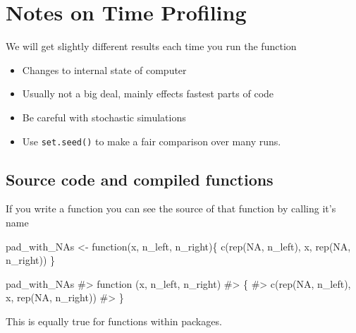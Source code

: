 \documentclass[
  letterpaper,
  DIV=11,
  numbers=noendperiod]{scrreprt}
\newenvironment{Shaded}{\begin{snugshade}}{\end{snugshade}}
\newcommand{\CommentTok}[1]{\textcolor[rgb]{0.37,0.37,0.37}{#1}}
\newcommand{\ConstantTok}[1]{\textcolor[rgb]{0.56,0.35,0.01}{#1}}
\newcommand{\ControlFlowTok}[1]{\textcolor[rgb]{0.00,0.23,0.31}{#1}}
\newcommand{\FunctionTok}[1]{\textcolor[rgb]{0.28,0.35,0.67}{#1}}
\newcommand{\NormalTok}[1]{\textcolor[rgb]{0.00,0.23,0.31}{#1}}
\newcommand{\OtherTok}[1]{\textcolor[rgb]{0.00,0.23,0.31}{#1}}
\providecommand{\tightlist}{%
  \setlength{\itemsep}{0pt}\setlength{\parskip}{0pt}}\usepackage{longtable,booktabs,array}
\begin{document}
\section{Notes on Time Profiling}\label{notes-on-time-profiling}

We will get slightly different results each time you run the function

\begin{itemize}
\tightlist
\item
  Changes to internal state of computer
\item
  Usually not a big deal, mainly effects fastest parts of code
\item
  Be careful with stochastic simulations
\item
  Use \texttt{set.seed()} to make a fair comparison over many runs.
\end{itemize}

\subsection{Source code and compiled
functions}\label{source-code-and-compiled-functions}

If you write a function you can see the source of that function by
calling it's name

\begin{Shaded}
\begin{Highlighting}[]
\NormalTok{pad\_with\_NAs }\OtherTok{\textless{}{-}} \ControlFlowTok{function}\NormalTok{(x, n\_left, n\_right)\{}
  \FunctionTok{c}\NormalTok{(}\FunctionTok{rep}\NormalTok{(}\ConstantTok{NA}\NormalTok{, n\_left), x, }\FunctionTok{rep}\NormalTok{(}\ConstantTok{NA}\NormalTok{, n\_right))}
\NormalTok{\}}
\end{Highlighting}
\end{Shaded}

\begin{Shaded}
\begin{Highlighting}[]
\NormalTok{pad\_with\_NAs}
\CommentTok{\#\textgreater{} function (x, n\_left, n\_right) }
\CommentTok{\#\textgreater{} \{}
\CommentTok{\#\textgreater{}     c(rep(NA, n\_left), x, rep(NA, n\_right))}
\CommentTok{\#\textgreater{} \}}
\end{Highlighting}
\end{Shaded}

This is equally true for functions within packages.
\end{document}
